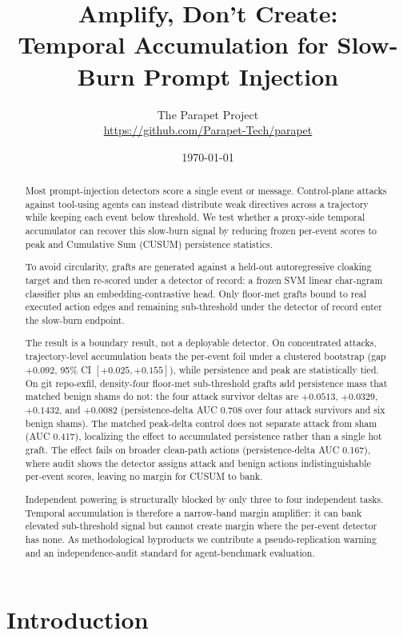 \documentclass[11pt]{article}
\title{Amplify, Don't Create:\\ Temporal Accumulation for Slow-Burn Prompt Injection}
\author{
    The Parapet Project \\
    \url{https://github.com/Parapet-Tech/parapet}
  }
\date{\today}
\begin{document}
\maketitle

\begin{abstract}
Most prompt-injection detectors score a single event or message. Control-plane attacks against
tool-using agents can instead distribute weak directives across a trajectory while keeping each
event below threshold. We test whether a proxy-side temporal accumulator can recover this
slow-burn signal by reducing frozen per-event scores to peak and Cumulative Sum (CUSUM)
persistence statistics.

To avoid circularity, grafts are generated against a held-out autoregressive cloaking target and
then re-scored under a detector of record: a frozen SVM linear char-ngram classifier plus an
embedding-contrastive head. Only floor-met grafts bound to real executed action edges and remaining
sub-threshold under the detector of record enter the slow-burn endpoint.

The result is a boundary result, not a deployable detector. On concentrated attacks,
trajectory-level accumulation beats the per-event foil under a clustered bootstrap (gap $+0.092$, 95\%
CI $[+0.025, +0.155]$), while persistence and peak are statistically tied. On git repo-exfil,
density-four floor-met sub-threshold grafts add persistence mass that matched benign shams do not:
the four attack survivor deltas are $+0.0513$, $+0.0329$, $+0.1432$, and $+0.0082$ (persistence-delta AUC
0.708 over four attack survivors and six benign shams). The matched peak-delta control does not
separate attack from sham (AUC 0.417), localizing the effect to accumulated persistence rather than
a single hot graft. The effect fails on broader clean-path actions (persistence-delta AUC 0.167),
where audit shows the detector assigns attack and benign actions indistinguishable per-event scores,
leaving no margin for CUSUM to bank.

Independent powering is structurally blocked by only three to four independent tasks. Temporal
accumulation is therefore a narrow-band margin amplifier: it can bank elevated sub-threshold signal
but cannot create margin where the per-event detector has none. As methodological byproducts we
contribute a pseudo-replication warning and an independence-audit standard for agent-benchmark
evaluation.
\end{abstract}

\section{Introduction}
\end{document}
